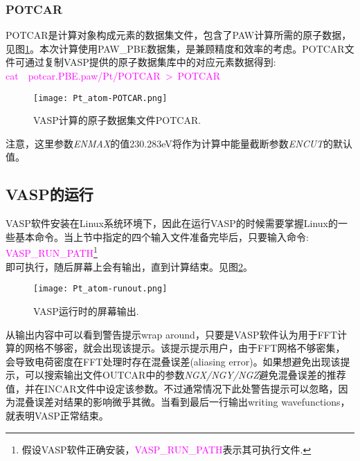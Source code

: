 \subsubsection{\rm{POTCAR}}
\textrm{POTCAR}是计算对象构成元素的数据集文件，包含了\textrm{PAW}计算所需的原子数据，见图\ref{Pt_atom:POTCAR}。本次计算使用\textrm{PAW\_PBE}数据集，是兼顾精度和效率的考虑。\textrm{POTCAR}文件可通过复制\textrm{VASP}提供的原子数据集库中的对应元素数据得到:\\
\textcolor{magenta}{\textrm{cat~~potcar.PBE.paw/Pt/POTCAR~>~POTCAR}}\\
\begin{figure}[h!]
\centering
\texttt{[image: Pt\_atom-POTCAR.png]}
\caption{\small \textrm{VASP}计算的原子数据集文件\textrm{POTCAR}.}%
\label{Pt_atom:POTCAR}
\end{figure}
注意，这里参数\textit{ENMAX}的值230.283\textrm{eV}将作为计算中能量截断参数\textit{ENCUT}的默认值。

\subsection{VASP的运行}
\textrm{VASP}软件安装在\textrm{Linux}系统环境下，因此在运行\textrm{VASP}的时候需要掌握\textrm{Linux}的一些基本命令。当上节中指定的四个输入文件准备完毕后，只要输入命令:\\
\textcolor{magenta}{\textrm{VASP\_RUN\_PATH}}\footnote{假设\textrm{VASP}软件正确安装，\textcolor{magenta}{\textrm{VASP\_RUN\_PATH}}表示其可执行文件.}\\
即可执行，随后屏幕上会有输出，直到计算结束。见图\ref{Pt_atom:runout}。
\begin{figure}[h!]
\centering
\texttt{[image: Pt\_atom-runout.png]}
\caption{\small \textrm{VASP}运行时的屏幕输出.}%
\label{Pt_atom:runout}
\end{figure}
从输出内容中可以看到警告提示\textrm{wrap around}，只要是\textrm{VASP}软件认为用于\textrm{FFT}计算的网格不够密，就会出现该提示。该提示提示用户，由于\textrm{FFT}网格不够密集，会导致电荷密度在\textrm{FFT}处理时存在混叠误差\textrm{(aliasing error)}。如果想避免出现该提示，可以搜索输出文件\textrm{OUTCAR}中的参数\textit{NGX/NGY/NGZ}避免混叠误差的推荐值，并在\textrm{INCAR}文件中设定该参数。不过通常情况下此处警告提示可以忽略，因为混叠误差对结果的影响微乎其微。当看到最后一行输出\textrm{writing wavefunctions}，就表明\textrm{VASP}正常结束。
\newpage
